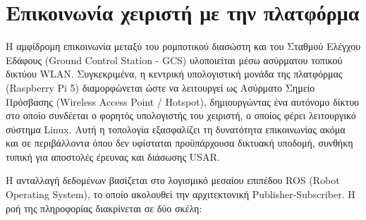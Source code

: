 \section{Επικοινωνία χειριστή με την πλατφόρμα}

Η αμφίδρομη επικοινωνία μεταξύ του ρομποτικού διασώστη και του Σταθμού Ελέγχου Εδάφους (Ground Control Station - GCS) υλοποιείται μέσω ασύρματου τοπικού δικτύου WLAN. Συγκεκριμένα, η κεντρική υπολογιστική μονάδα της πλατφόρμας (Raspberry Pi 5) διαμορφώνεται ώστε να λειτουργεί ως Ασύρματο Σημείο Πρόσβασης (Wireless Access Point / Hotspot), δημιουργώντας ένα αυτόνομο δίκτυο στο οποίο συνδέεται ο φορητός υπολογιστής του χειριστή, ο οποίος φέρει λειτουργικό σύστημα Linux. Αυτή η τοπολογία εξασφαλίζει τη δυνατότητα επικοινωνίας ακόμα και σε περιβάλλοντα όπου δεν υφίσταται προϋπάρχουσα δικτυακή υποδομή, συνθήκη τυπική για αποστολές έρευνας και διάσωσης USAR.

\par Η ανταλλαγή δεδομένων βασίζεται στο λογισμικό μεσαίου επιπέδου ROS (Robot Operating System), το οποίο ακολουθεί την αρχιτεκτονική Publisher-Subscriber. Η ροή της πληροφορίας διακρίνεται σε δύο σκέλη:

